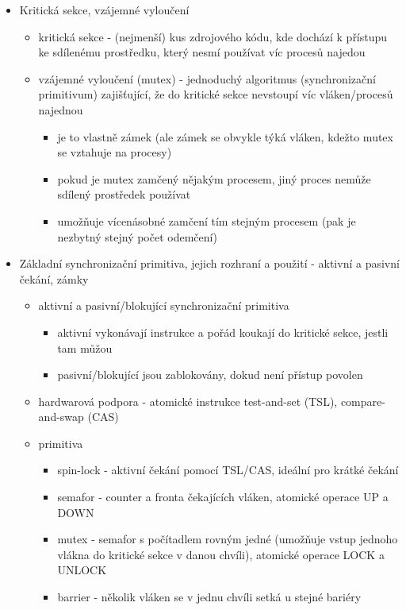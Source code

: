 \begin{itemize}
\begin{itemize}
\end{itemize}
\item Kritická sekce, vzájemné vyloučení
\begin{itemize}
\item kritická sekce - (nejmenší) kus zdrojového kódu, kde dochází k přístupu ke sdílenému prostředku, který nesmí používat víc procesů najedou
\item vzájemné vyloučení (mutex) - jednoduchý algoritmus (synchronizační primitivum) zajišťující, že do kritické sekce nevstoupí víc vláken/procesů najednou
\begin{itemize}
\item je to vlastně zámek (ale zámek se obvykle týká vláken, kdežto mutex se vztahuje na procesy)
\item pokud je mutex zamčený nějakým procesem, jiný proces nemůže sdílený prostředek používat
\item umožňuje vícenásobné zamčení tím stejným procesem (pak je nezbytný stejný počet odemčení)
\end{itemize}
\end{itemize}
\item Základní synchronizační primitiva, jejich rozhraní a použití - aktivní a pasivní čekání, zámky
\begin{itemize}
\item aktivní a pasivní/blokující synchronizační primitiva
\begin{itemize}
\item aktivní vykonávají instrukce a pořád koukají do kritické sekce, jestli tam můžou
\item pasivní/blokující jsou zablokovány, dokud není přístup povolen
\end{itemize}
\item hardwarová podpora - atomické instrukce test-and-set (TSL), compare-and-swap (CAS)
\item primitiva
\begin{itemize}
\item spin-lock - aktivní čekání pomocí TSL/CAS, ideální pro krátké čekání
\item semafor - counter a fronta čekajících vláken, atomické operace UP a DOWN
\item mutex - semafor s počítadlem rovným jedné (umožňuje vstup jednoho vlákna do kritické sekce v danou chvíli), atomické operace LOCK a UNLOCK
\item barrier - několik vláken se v jednu chvíli setká u stejné bariéry
\end{itemize}
\end{itemize}
\end{itemize}
